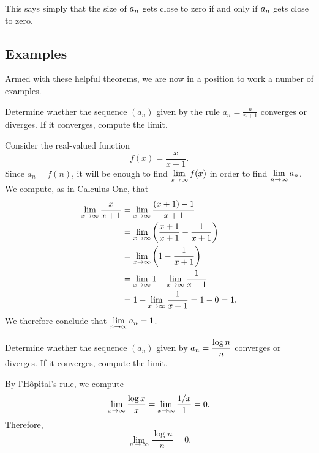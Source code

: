 This says simply that the size of $\displaystyle a_n$ gets close to zero if and
only if $\displaystyle a_n$ gets close to zero.

\subsection{Examples}

Armed with these helpful theorems, we are now in a position to work a
number of examples.

\begin{example}
Determine whether the sequence $(a_n)$ given by the rule $a_n = \frac{n}{n+1}$ converges or
diverges. If it converges, compute the limit.
\end{example}

\begin{solution}
Consider the real-valued function
$$
f(x) = \frac{x}{x+1}.
$$
Since $a_n = f(n)$, it will be enough to find $\displaystyle\lim_{x \to \infty} f(x)$ in order to find $\displaystyle\lim_{n \to \infty} a_n$.
We compute, as in Calculus One, that
\begin{align*}
\lim_{x\to\infty}{x\over x+1}
&= \lim_{x\to\infty} \frac{(x+1) - 1}{x+1} \\
&= \lim_{x\to\infty} \left( \frac{x+1}{x+1} - \frac{1}{x+1} \right) \\
&= \lim_{x\to\infty} \left( 1 - \frac{1}{x+1} \right) \\
&= \lim_{x\to\infty} 1 - \lim_{x \to \infty} \frac{1}{x+1} \\
&= 1 - \lim_{x \to \infty} \frac{1}{x+1} = 1 - 0 = 1. \\
\end{align*}
We therefore conclude that $\displaystyle\lim_{n \to \infty} a_n = 1$.
\end{solution}

\begin{example}
\label{example:log-n-over-n}
Determine whether the sequence $(a_n)$ given by $\displaystyle a_n = \frac{\log n}{n}$ converges or
diverges.  If it converges, compute the limit.
\end{example}

\begin{solution}
By l'H\^opital's rule, we compute
$$\lim_{x\to\infty}{\log x\over x}=\lim_{x\to\infty}{1/x\over 1}=
0.$$
Therefore, $$\lim_{n \to \infty}  \frac{\log n}{n} = 0.$$
\end{solution}

